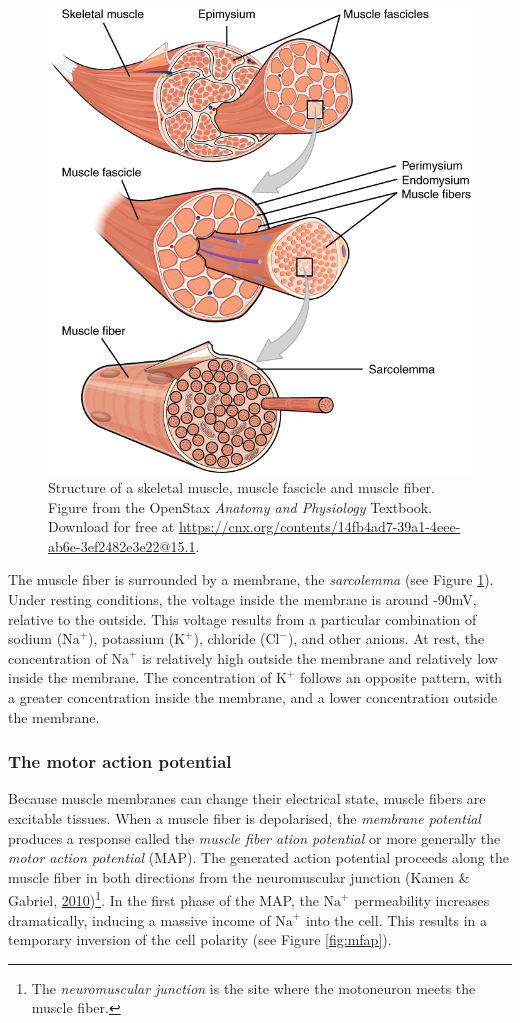 \documentclass[a4paper,12pt,twoside,openright,oldfontcommands,final]{memoir}
\let\rmarkdownfootnote\footnote%
\def\footnote{\protect\rmarkdownfootnote}
\begin{document}
\begin{figure}

{\centering \includegraphics[width=0.5\linewidth]{assets/muscle} 

}

\caption{Structure of a skeletal muscle, muscle fascicle and muscle fiber. Figure from the OpenStax \textit{Anatomy and Physiology} Textbook. Download for free at \url{https://cnx.org/contents/14fb4ad7-39a1-4eee-ab6e-3ef2482e3e22@15.1}.}\label{fig:muscle}
\end{figure}

The muscle fiber is surrounded by a membrane, the \emph{sarcolemma} (see Figure \ref{fig:muscle}). Under resting conditions, the voltage inside the membrane is around -90mV, relative to the outside. This voltage results from a particular combination of sodium (\(\text{Na}^{+}\)), potassium (\(\text{K}^{+}\)), chloride (\(\text{Cl}^{-}\)), and other anions. At rest, the concentration of \(\text{Na}^{+}\) is relatively high outside the membrane and relatively low inside the membrane. The concentration of \(\text{K}^{+}\) follows an opposite pattern, with a greater concentration inside the membrane, and a lower concentration outside the membrane.

\hypertarget{the-motor-action-potential}{%
\subsubsection{The motor action potential}\label{the-motor-action-potential}}

Because muscle membranes can change their electrical state, muscle fibers are excitable tissues. When a muscle fiber is depolarised, the \emph{membrane potential} produces a response called the \emph{muscle fiber ation potential} or more generally the \emph{motor action potential} (MAP). The generated action potential proceeds along the muscle fiber in both directions from the neuromuscular junction (Kamen \& Gabriel, \protect\hyperlink{ref-kamen_essentials_2010}{2010})\footnote{The \emph{neuromuscular junction} is the site where the motoneuron meets the muscle fiber.}. In the first phase of the MAP, the \(\text{Na}^{+}\) permeability increases dramatically, inducing a massive income of \(\text{Na}^{+}\) into the cell. This results in a temporary inversion of the cell polarity (see Figure \ref{fig:mfap}).
\end{document}
